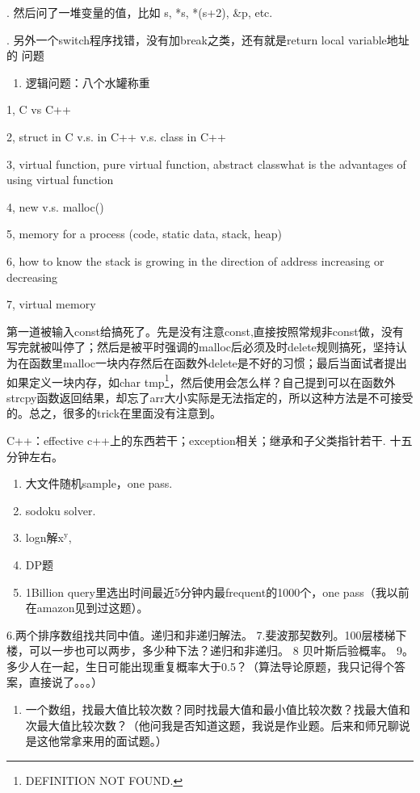 \documentclass[12pt]{book}
\begin{document}
. 然后问了一堆变量的值，比如 s, *s, *(s+2), \&p, etc.

. 另外一个switch程序找错，没有加break之类，还有就是return local variable地址的
问题

\begin{enumerate}
\item 逻辑问题：八个水罐称重
\end{enumerate}

1, C vs C++

2, struct in C v.s. in C++ v.s. class in C++

3, virtual function, pure virtual function, abstract classwhat is the advantages of using virtual function

4, new v.s. malloc()

5, memory for a process (code, static data, stack, heap)

6, how to know the stack is growing in the direction of address increasing 
or decreasing

7, virtual memory

第一道被输入const给搞死了。先是没有注意const,直接按照常规非const做，没有写完就被叫停了；然后是被平时强调的malloc后必须及时delete规则搞死，坚持认为在函数里malloc一块内存然后在函数外delete是不好的习惯；最后当面试者提出如果定义一块内存，如char tmp\footnote{DEFINITION NOT FOUND.}，然后使用会怎么样？自己提到可以在函数外strcpy函数返回结果，却忘了arr大小实际是无法指定的，所以这种方法是不可接受的。总之，很多的trick在里面没有注意到。

C++：effective c++上的东西若干；exception相关；继承和子父类指针若干. 十五分钟左右。
\begin{enumerate}
\item 大文件随机sample，one pass.
\item sodoku solver.
\item logn解x$^{\text{y}}$,
\item DP题
\item 1Billion query里选出时间最近5分钟内最frequent的1000个，one pass（我以前在amazon见到过这题）。
\end{enumerate}
6.两个排序数组找共同中值。递归和非递归解法。
7.斐波那契数列。100层楼梯下楼，可以一步也可以两步，多少种下法？递归和非递归。 
8 贝叶斯后验概率。
9。多少人在一起，生日可能出现重复概率大于0.5？（算法导论原题，我只记得个答案，直接说了。。。）
\begin{enumerate}
\item 一个数组，找最大值比较次数？同时找最大值和最小值比较次数？找最大值和次最大值比较次数？（他问我是否知道这题，我说是作业题。后来和师兄聊说是这他常拿来用的面试题。）
\end{enumerate}
\end{document}
